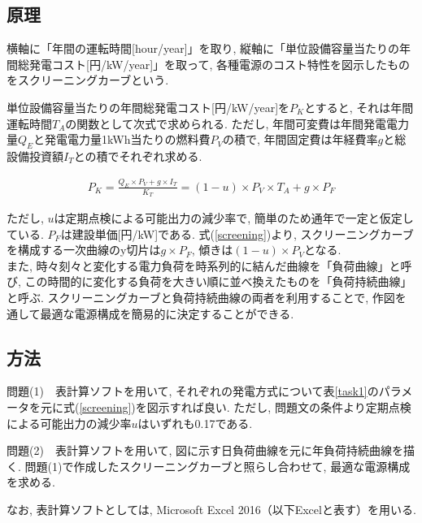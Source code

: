 \documentclass[]{jsarticle}
\begin{document}

    \subsection{原理}
        横軸に「年間の運転時間[hour/year]」を取り, 縦軸に「単位設備容量当たりの年間総発電コスト[円/kW/year]」を取って, 各種電源のコスト特性を図示したものをスクリーニングカーブという.

        単位設備容量当たりの年間総発電コスト[円/kW/year]を$P_K$とすると, それは年間運転時間$T_A$の関数として次式で求められる. ただし, 年間可変費は年間発電電力量$Q_E$と発電電力量1kWh当たりの燃料費$P_V$の積で, 年間固定費は年経費率$g$と総設備投資額$I_T$との積でそれぞれ求める.

        \begin{eqnarray}
          \label{screening}
          P_K = \frac{Q_E \times P_V + g \times I_T}{K_T} = (1-u) \times P_V \times T_A + g \times P_F
        \end{eqnarray}

        ただし, $u$は定期点検による可能出力の減少率で, 簡単のため通年で一定と仮定している. $P_F$は建設単価[円/kW]である. 式(\ref{screening})より, スクリーニングカーブを構成する一次曲線のy切片は$g \times P_F$, 傾きは$(1-u)\times P_V$となる.\\

        また, 時々刻々と変化する電力負荷を時系列的に結んだ曲線を「負荷曲線」と呼び, この時間的に変化する負荷を大きい順に並べ換えたものを「負荷持続曲線」と呼ぶ. スクリーニングカーブと負荷持続曲線の両者を利用することで, 作図を通して最適な電源構成を簡易的に決定することができる.


    \subsection{方法}
        問題(1)　表計算ソフトを用いて, それぞれの発電方式について表\ref{task1}のパラメータを元に式(\ref{screening})を図示すれば良い. ただし, 問題文の条件より定期点検による可能出力の減少率$u$はいずれも0.17である.

        問題(2)　表計算ソフトを用いて, 図に示す日負荷曲線を元に年負荷持続曲線を描く. 問題(1)で作成したスクリーニングカーブと照らし合わせて, 最適な電源構成を求める.

        なお, 表計算ソフトとしては, Microsoft Excel 2016（以下Excelと表す）を用いる.

\end{document}
